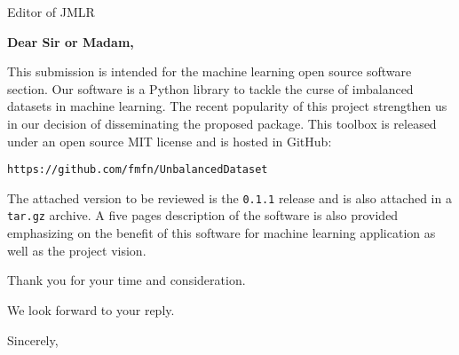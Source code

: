 \documentclass{letter}
\begin{document}

\begin{letter}{Editor of JMLR} %


\opening{\textbf{Dear Sir or Madam,}}

This submission is intended for the machine learning open source software section.
Our software is a Python library to tackle the curse of imbalanced datasets in machine learning.
The recent popularity of this project strengthen us in our decision of disseminating the proposed package. 
This toolbox is released under an open source MIT license and is hosted in GitHub:

\texttt{https://github.com/fmfn/UnbalancedDataset}

The attached version to be reviewed is the \texttt{0.1.1} release and is also attached in a \texttt{tar.gz} archive.
A five pages description of the software is also provided emphasizing on the benefit of this software for machine learning application as well as the project vision.

Thank you for your time and consideration.

We look forward to your reply.

\vspace{2\parskip} %
\closing{Sincerely,}
\vspace{2\parskip} %


\end{letter}
 
\end{document}

